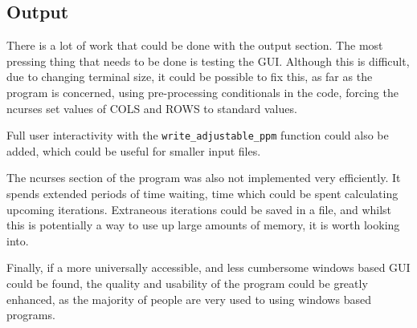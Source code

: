 \subsection{Output}
	There is a lot of work that could be done with the output section.
	The most pressing thing that needs to be done is testing the GUI.
	Although this is difficult, due to changing terminal size, it could be possible to fix this, as far as the program is concerned, using
	pre-processing conditionals in the code, forcing the ncurses set values of COLS and ROWS to standard values.
	
	Full user interactivity with the \texttt{write\_adjustable\_ppm} function could also be added, which could be useful for smaller input files.

	The ncurses section of the program was also not implemented very efficiently.
	It spends extended periods of time waiting, time which could be spent calculating upcoming iterations.
	Extraneous iterations could be saved in a file, and whilst this is potentially a way to use up large amounts of memory, it is worth looking into.
	
	Finally, if a more universally accessible, and less cumbersome windows based GUI could be found, the quality and usability of the program could be greatly enhanced, as the majority of people are very used to using windows based programs.
